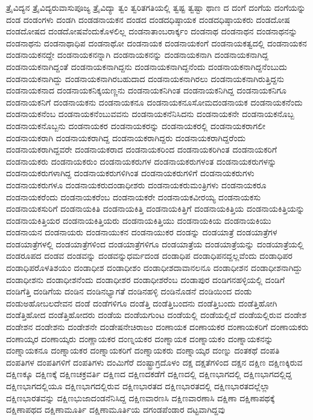 {ತ್ರೈವಿದ್ಯನ
ತ್ರೈವಿದ್ಯರುವಾಸುಪೂಜ್ಯ
ತ್ರೈವಿದ್ಯಾ
ತ್ವಂ
ತ್ವರಿತಗತಿಯಲ್ಲಿ
ತ್ವಷ್ಟ
ತ್ವಷ್ಟಾ
ಥಾಣ
ದ
ದಂಗೆ
ದಂಗೆಯ
ದಂಗೆಯನ್ನು
ದಂಡ
ದಂಡಂಗಳು
ದಂಡಗಿ
ದಂಡಡನಾಯಕನ
ದಂಡದ
ದಂಡದಧಿಷ್ಠಾಯಕ
ದಂಡದಧಿಷ್ಠಾಯಕರು
ದಂಡದೋಷ
ದಂಡದೋಷದ
ದಂಡದೋಷವೆಂದುಕೊಳಲಿಲ್ಲ
ದಂಡನಾತಾಂಬರಾರ್ಕ್ಕಂ
ದಂಡನಾಥ
ದಂಡನಾಥನ
ದಂಡನಾಥನನ್ನು
ದಂಡನಾಥನು
ದಂಡನಾಥಾಧಿಪ
ದಂಡನಾಥೋ
ದಂಡನಾಯಕ
ದಂಡನಾಯಕಂಗೆ
ದಂಡನಾಯಕತ್ವದಲ್ಲಿ
ದಂಡನಾಯಕನ
ದಂಡನಾಯಕನದ್ದೇ
ದಂಡನಾಯಕನನ್ನಾಗಿ
ದಂಡನಾಯಕನನ್ನು
ದಂಡನಾಯಕನಾಗಿ
ದಂಡನಾಯಕನಾಗಿದ್ದ
ದಂಡನಾಯಕನಾಗಿದ್ದಂತೆ
ದಂಡನಾಯಕನಾಗಿದ್ದನು
ದಂಡನಾಯಕನಾಗಿದ್ದನೆಂದು
ದಂಡನಾಯಕನಾಗಿದ್ದನೆಂಬುದು
ದಂಡನಾಯಕನಾಗಿದ್ದು
ದಂಡನಾಯಕನಾಗಿರಬಹುದಾದ
ದಂಡನಾಯಕನಾಗಿರಲು
ದಂಡನಾಯಕನಾಗಿರುತ್ತಿದ್ದನು
ದಂಡನಾಯಕನಾದ
ದಂಡನಾಯಕನಿಕ್ಕಯಣ್ಣನು
ದಂಡನಾಯಕನಿಗಿಂತ
ದಂಡನಾಯಕನಿಗಿದ್ದ
ದಂಡನಾಯಕನಿಗೂ
ದಂಡನಾಯಕನಿಗೆ
ದಂಡನಾಯಕನು
ದಂಡನಾಯಕನೂ
ದಂಡನಾಯಕನೂಸೋಮದಂಡನಾಯಕ
ದಂಡನಾಯಕನೆಂದು
ದಂಡನಾಯಕನೆಂಬ
ದಂಡನಾಯಕನೆಂಬುವವನು
ದಂಡನಾಯಕನೆನಿಸಿದನು
ದಂಡನಾಯಕನೇ
ದಂಡನಾಯಕನೊಬ್ಬ
ದಂಡನಾಯಕನೊಬ್ಬನು
ದಂಡನಾಯಕರ
ದಂಡನಾಯಕರನ್ನು
ದಂಡನಾಯಕರಲ್ಲಿ
ದಂಡನಾಯಕರಾಗಲೀ
ದಂಡನಾಯಕರಾಗಿ
ದಂಡನಾಯಕರಾಗಿದ್ದ
ದಂಡನಾಯಕರಾಗಿದ್ದರು
ದಂಡನಾಯಕರಾಗಿದ್ದರೆಂದು
ದಂಡನಾಯಕರಾಗಿದ್ದವರೇ
ದಂಡನಾಯಕರಾದ
ದಂಡನಾಯಕರಿಂದ
ದಂಡನಾಯಕರಿಗಿಂತ
ದಂಡನಾಯಕರಿಗೆ
ದಂಡನಾಯಕರು
ದಂಡನಾಯಕರುಂ
ದಂಡನಾಯಕರುಗಳ
ದಂಡನಾಯಕರುಗಳಂತ
ದಂಡನಾಯಕರುಗಳನ್ನು
ದಂಡನಾಯಕರುಗಳಾಗಿದ್ದ
ದಂಡನಾಯಕರುಗಳಿಗಿಂತ
ದಂಡನಾಯಕರುಗಳಿಗೆ
ದಂಡನಾಯಕರುಗಳು
ದಂಡನಾಯಕರುಗಳೂ
ದಂಡನಾಯಕರುದಂಡಾಧೀಶರು
ದಂಡನಾಯಕರುಮಂತ್ರಿಗಳು
ದಂಡನಾಯಕರೂ
ದಂಡನಾಯಕರೆಂದು
ದಂಡನಾಯಕರೆಂಬ
ದಂಡನಾಯಕರೇ
ದಂಡನಾಯಕವೀರಯ್ಯ
ದಂಡನಾಯಕಸು
ದಂಡನಾಯಕಸುರಿಗೆ
ದಂಡನಾಯಕಿತಿ
ದಂಡನಾಯಕಿತ್ತಿ
ದಂಡನಾಯಕಿತ್ತಿಗೆ
ದಂಡನಾಯಕಿತ್ತಿಯ
ದಂಡನಾಯಕಿತ್ತಿಯನ್ನು
ದಂಡನಾಯಕಿತ್ತಿಯರ
ದಂಡನಾಯಕಿತ್ತಿಯರು
ದಂಡನಾಯಕಿತ್ತಿಯು
ದಂಡನಾಯಕಿಯ
ದಂಡನಾಯಕಿಯು
ದಂಡನಾಯನ
ದಂಡನಾಯರು
ದಂಡನಾಯುಕನ
ದಂಡನಾಯುಕರ
ದಂಡನ್ನು
ದಂಡಯಾತ್ರೆ
ದಂಡಯಾತ್ರೆಗಳ
ದಂಡಯಾತ್ರೆಗಳಲ್ಲಿ
ದಂಡಯಾತ್ರೆಗಳಿಂದ
ದಂಡಯಾತ್ರೆಗಳಿಗೂ
ದಂಡಯಾತ್ರೆಯ
ದಂಡಯಾತ್ರೆಯನ್ನು
ದಂಡಯಾತ್ರೆಯಲ್ಲಿ
ದಂಡರೂಪದ
ದಂಡವ
ದಂಡವನ್ನು
ದಂಡವನ್ನುಧರ್ಮದಂಡ
ದಂಡಾಧಿಪ
ದಂಡಾಧಿಪನದ್ದಲ್ಲವೆಂದು
ದಂಡಾಧಿಪರ
ದಂಡಾಧಿಪರೊಳತಿಶಯಂ
ದಂಡಾಧೀಶ
ದಂಡಾಧೀಶಂ
ದಂಡಾಧೀಶದಾವಾನಲನೂ
ದಂಡಾಧೀಶನ
ದಂಡಾಧೀಶನಾಗಿದ್ದು
ದಂಡಾಧೀಶನು
ದಂಡಾಧೀಶನೆಂದು
ದಂಡಾಧೀಶರ
ದಂಡಾಧೀಶರೆಂಬ
ದಂಡಾಪುರ
ದಂಡಿಗನಹಳ್ಳಿಯಲ್ಲಿ
ದಂಡಿಗೆ
ದಂಡಿಗೆತ್ತಿ
ದಂಡಿಗೆಯ
ದಂಡಿನ
ದಂಡಿನಭ್ಯಾಗತೆ
ದಂಡಿನಹಳ್ಳಿ
ದಂಡಿನೊಡನೆ
ದಂಡಿಯಿಂದ
ದಂಡು
ದಂಡುಅಹೋಬಲದೇವನ
ದಂಡೆ
ದಂಡೆಗಳಿಗೂ
ದಂಡೆತ್ತಿ
ದಂಡೆತ್ತಿಬಂದನು
ದಂಡೆತ್ತಿಬಂದು
ದಂಡೆತ್ತಿಹೋಗಿ
ದಂಡೆತ್ತಿಹೋದ
ದಂಡೆತ್ತಿಹೋದರು
ದಂಡೆಯ
ದಂಡೆಯಗುಂಟ
ದಂಡೆಯಲ್ಲಿ
ದಂಡೆಯಲ್ಲಿದೆ
ದಂಡೆಯಲ್ಲಿರುವ
ದಂಡೇಶ
ದಂಡೇಶನ
ದಂಡೇಶನು
ದಂಡೇಶನೇ
ದಂಡೇಷನೇಚಿರಾಜಂ
ದಂಣಾಯಕ
ದಂಣಾಯಕರ
ದಂಣಾಯಕರಿಗೆ
ದಂಣಾಯಕರು
ದಂಣಾಯ್ಕರ
ದಂಣಾಯ್ಕರು
ದಂಣ್ಣಾಯಕರ
ದಂಣ್ನಯಕರ
ದಂಣ್ನಾಯಕ
ದಂಣ್ನಾಯಕಂ
ದಂಣ್ನಾಯಕನನ್ನು
ದಂಣ್ನಾಯಕನೂ
ದಂಣ್ನಾಯಕರ
ದಂಣ್ನಾಯಕರಿಗೆ
ದಂಣ್ನಾಯಕರು
ದಂಣ್ನಾಯ್ಕರ
ದಂಣ್ನು
ದಂತಕಥೆ
ದಂಪತಿ
ದಂಪತಿಗಳ
ದಂಪತಿಗಳಿಗೆ
ದಂಪತಿಗಳು
ದಂಮಿಗೆರೆ
ದಂಷ್ಟ್ರಾಗ್ರದೊಳಂ
ದಕ್ಷ
ದಕ್ಷತೆಗಳಿಂದ
ದಕ್ಷನ
ದಕ್ಷಿಣ
ದಕ್ಷಿಣಕ್ಕಿರುವ
ದಕ್ಷಿಣಕ್ಕೂ
ದಕ್ಷಿಣಕ್ಕೆ
ದಕ್ಷಿಣಚಕ್ರವರ್ತಿ
ದಕ್ಷಿಣದ
ದಕ್ಷಿಣದಕಡೆಗೆ
ದಕ್ಷಿಣದಲ್ಲಿ
ದಕ್ಷಿಣಭಾಗದಲ್ಲಿ
ದಕ್ಷಿಣಭಾಗದಲ್ಲಿದ್ದ
ದಕ್ಷಿಣಭಾಗದಲ್ಲಿಯೂ
ದಕ್ಷಿಣಭಾಗದಲ್ಲಿರುವ
ದಕ್ಷಿಣಭಾರತದ
ದಕ್ಷಿಣಭಾರತದಲ್ಲಿ
ದಕ್ಷಿಣಭಾರತದಲ್ಲೆಲ್ಲಾ
ದಕ್ಷಿಣಭಾರತವನ್ನು
ದಕ್ಷಿಣಭುಜಾದಂಡನೆನಿಸಿದ್ದ
ದಕ್ಷಿಣವಾರಣಸಿ
ದಕ್ಷಿಣವಾರಣಾಸಿ
ದಕ್ಷಿಣಾ
ದಕ್ಷಿಣಾಪಥಕ್ಕೆ
ದಕ್ಷಿಣಾಪಥದ
ದಕ್ಷಿಣಾಮೂರ್ತಿ
ದಕ್ಷಿಣಾಮೂರ್ತಿಯ
ದಗಂಡಪೆಂಡಾರ
ದಟ್ಟವಾಗಿದ್ದವು
}
